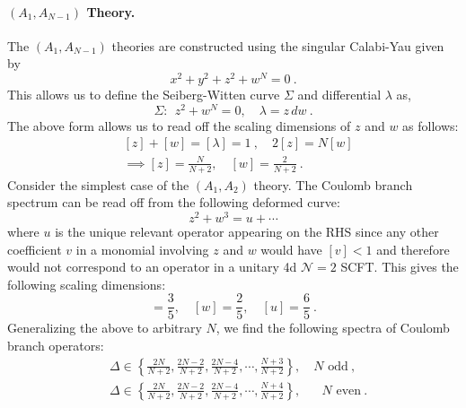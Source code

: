 \documentclass[a4paper,10pt]{article}
\newcommand{\tsf}[1]{\textsf{#1}}
\begin{document}
\paragraph{$(A_1,A_{N-1})$ Theory.}
The $(A_1,A_{N-1})$ theories are constructed using the singular Calabi-Yau given by \cite{Cecotti:2010fi}
\begin{equation}
    x^2+y^2+z^2+w^{N}=0~.
\end{equation}
This allows us to define the Seiberg-Witten curve $\Sigma$ and differential $\lambda$ as,
\begin{equation}
    \Sigma:~~z^2+w^{N}=0, \quad \lambda=z\,dw~.
\end{equation}
The above form allows us to read off the scaling dimensions of $z$ and $w$ as follows:
\begin{equation}
    \begin{split}
        &[z]+[w]=[\lambda]=1~,\quad 2[z]=N[w]  \\
    &\implies [z]=\frac{N}{N+2}, \quad [w]=\frac{2}{N+2}~.
    \end{split}
\end{equation}
Consider the simplest case of the $(A_1,A_2)$ theory. The Coulomb branch spectrum can be read off from the following deformed curve:
\begin{equation}
    z^2+w^3=u+\cdots
\end{equation}
where $u$ is the unique relevant operator appearing on the \tsf{RHS} since any other coefficient $v$ in a monomial involving $z$ and $w$ would have $[v]<1$ and therefore would not correspond to an operator in a unitary 4d $\mathcal{N}=2$ \tsf{SCFT}. 
This gives the following scaling dimensions:
\begin{equation}
    [z]=\frac{3}{5}, \quad [w]=\frac{2}{5}, \quad [u]=\frac{6}{5}~.
\end{equation}
Generalizing the above to arbitrary $N$, we find the following spectra of Coulomb branch operators:
\begin{equation}
    \begin{split}
        &\Delta\in\left\{\frac{2N}{N+2},\frac{2N-2}{N+2},\frac{2N-4}{N+2},\cdots,\frac{N+3}{N+2}\right\},\quad  N\text{ odd}~, \\
        &\Delta\in\left\{\frac{2N}{N+2},\frac{2N-2}{N+2},\frac{2N-4}{N+2},\cdots,\frac{N+4}{N+2}\right\},\quad \text{ }N\text{ even}~.
    \end{split}
\end{equation}
\end{document}
